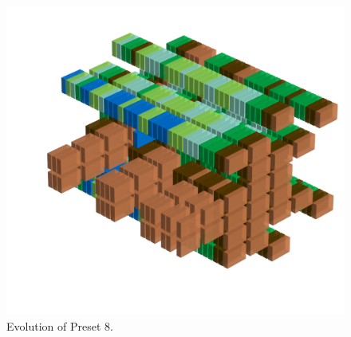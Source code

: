 \clearpage                                                                 
\begin{figure}[H]                                                          
  \centering                                                             
  \begin{adjustbox}{width=14cm,center}                                   
  \includegraphics[width=14cm]{src/presets/pattern8-45.png}%
  \end{adjustbox}                                                        
\caption{Evolution of Preset 8.}                                           
\end{figure}                                                               
\clearpage                                                                 
                                                                           
